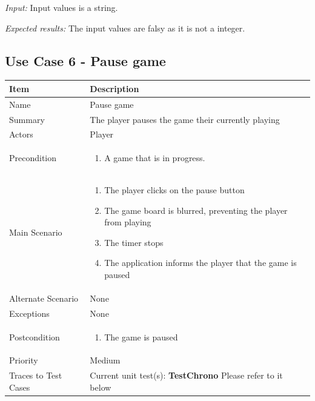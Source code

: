 \documentclass[12pt]{article}
\begin{document}
\textit{Input:} \newline
Input values is a string. \newline 

\textit{Expected results:} \newline
The input values are falsy as it is not a integer. \newline
\\

\newpage


\subsection{Use Case 6 - Pause game}

\begin{center}
\setlength{\tabcolsep}{18pt}
\renewcommand{\arraystretch}{1.3}
\begin{tabular}{ |p{3.4cm}|p{10cm}| }
    \hline
    \textbf{Item} & \textbf{Description} \\
    \hline
    Name & Pause game \\
    \hline
    Summary & The player pauses the game their currently playing \\
    \hline
    Actors & Player \\
    \hline
    Precondition & 
    \vspace*{-0.1in}
    \begin{enumerate}[leftmargin=0.2in]
        \item A game that is in progress.
    \end{enumerate}  \\
    \hline
    Main Scenario &     
    \vspace*{-0.1in}
    \begin{enumerate}[leftmargin=0.2in]
        \item The player clicks on the pause button
        \item The game board is blurred, preventing the player from playing
        \item The timer stops  
        \item The application informs the player that the game is paused
    \end{enumerate}  \\
    \hline
    Alternate Scenario & None \\
    \hline
    Exceptions & None \\
    \hline
    Postcondition & \vspace*{-0.1in}
    \begin{enumerate}[leftmargin=0.2in]
        \item The game is paused
    \end{enumerate}  \\
    \hline
    Priority & Medium  \\
    \hline
    \small{Traces to Test Cases} & Current unit test(s): \textbf{TestChrono} 
    \newline
    Please refer to it below  
    \\
    \hline
\end{tabular}
\end{center}
\end{document}
